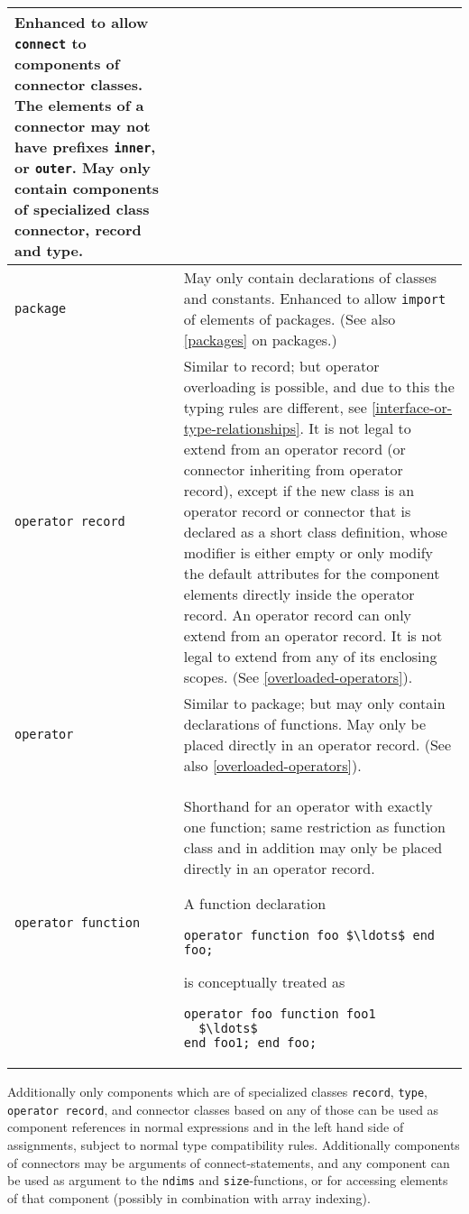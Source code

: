 \begin{longtable}{|p{4cm}|p{9cm}|}
Enhanced to allow \lstinline!connect! to components of connector classes. The
elements of a connector may not have prefixes \lstinline!inner!, or \lstinline!outer!. May only
contain components of specialized class connector, record and
type.\\ \hline
\lstinline!package! & May only contain declarations of classes and
constants. Enhanced to allow \lstinline!import! of elements of packages. (See also
\cref{packages} on packages.)\\ \hline
\lstinline!operator record! & Similar to record; but operator overloading
is possible, and due to this the typing rules are different, see
\cref{interface-or-type-relationships}. It is not legal to extend from an operator record (or
connector inheriting from operator record), except if the new class is
an operator record or connector that is declared as a short class
definition, whose modifier is either empty or only modify the default
attributes for the component elements directly inside the operator
record. An operator record can only extend from an operator record. It is not legal to extend
from any of its enclosing scopes. (See \cref{overloaded-operators}).
\\ \hline
\lstinline!operator! & Similar to package; but may only contain
declarations of functions. May only be placed directly in an operator
record. (See also \cref{overloaded-operators}).\\ \hline
\lstinline!operator function! & Shorthand for an
operator with exactly one function; same restriction as function class
and in addition may only be placed directly in an operator
record.
\begin{nonnormative}
A function declaration
\begin{lstlisting}[language=modelica]
operator function foo $\ldots$ end foo;
\end{lstlisting}
is conceptually treated as
\begin{lstlisting}[language=modelica]
operator foo function foo1
  $\ldots$
end foo1; end foo;
\end{lstlisting}
\end{nonnormative}
\\ \hline
\end{longtable}
Additionally only components which are of specialized classes \lstinline!record!, \lstinline!type!, \lstinline!operator record!, and
connector classes based on any of those can be used as component references in normal expressions and in the left hand
side of assignments, subject to normal type compatibility rules.
Additionally components of connectors may be arguments of connect-statements,
and any component can be used as argument to the \lstinline!ndims! and \lstinline!size!-functions, or for accessing
elements of that component (possibly in combination with array indexing).

